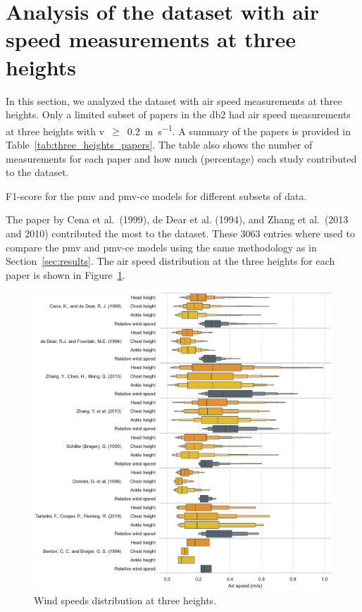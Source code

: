 \appendix

\section{Analysis of the dataset with air speed measurements at three heights}\label{sec:analysis-of-the-dataset-with-air-speed-measurements-at-three-heights}

In this section, we analyzed the dataset with air speed measurements at three heights.
Only a limited subset of papers in the \ac{db2} had air speed measurements at three heights with \ac{v}~$\geq$~\qty{0.2}{\m\per\s}.
A summary of the papers is provided in Table~\ref{tab:three_heights_papers}.
The table also shows the number of measurements for each paper and how much (percentage) each study contributed to the dataset.
\begin{table}[htb!]
    \centering
    
    \caption{F1-score for the \ac{pmv} and \ac{pmv-ce} models for different subsets of data.}
    \label{tab:three_heights_papers}
\end{table}
The paper by Cena et al.\ (1999), de Dear et al. (1994), and Zhang et al.\ (2013 and 2010) contributed the most to the dataset.
These \num{3063} entries where used to compare the \ac{pmv} and \ac{pmv-ce} models using the same methodology as in Section~\ref{sec:results}.
The air speed distribution at the three heights for each paper is shown in Figure~\ref{fig:boxenplot_wind_speed_three_heights}.
\begin{figure}[htb!]
    \centering
    \includegraphics[width=\textwidth]{figures/boxenplot_wind_speed_three_heights}
    \caption{Wind speeds distribution at three heights.}
    \label{fig:boxenplot_wind_speed_three_heights}
\end{figure}
